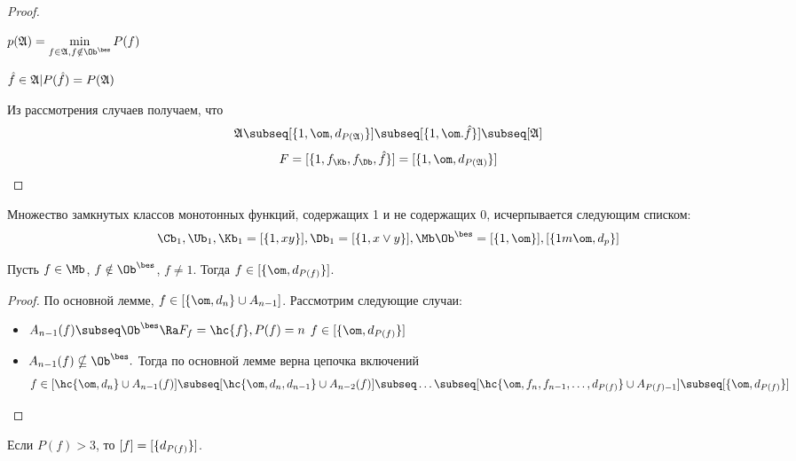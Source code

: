 \documentclass[unicode,10pt]{article}
\begin{document}
\begin{proof}
\begin{enumerate}
\begin{df}
\begin{math}
       p(\ag)=\min\limits_{f\in\ag,f\notin\Oib}P(f)
     \end{math}
   \end{df}
   \begin{denote}
     \begin{math}
       \hat{f}\in\mathfrak{A}|P(\hat{f})=P(\mathfrak{A})
     \end{math}
   \end{denote}
\end{enumerate}
Из рассмотрения случаев получаем, что
\begin{displaymath}
\ag\subseq\cls{1,\om,d_{P(\ag)}}\subseq\cls{1,\om.\hat{f}}\subseq[\ag]
\end{displaymath}
\begin{displaymath}
        F=\cls{1,\fK,\fD,\hat{f}}=\cls{1,\om, d_{P(\ag)}}
\end{displaymath}
\end{proof}
\begin{imp}
  Множество замкнутых классов монотонных функций, содержащих 1 и не содержащих
  0, исчерпывается следующим списком:
  \begin{displaymath}
    \Cb_1,\Ub_1,\Kb_1=\cls{1,xy},\Db_1=\cls{1,\dn}, \Mb\Oib=\cls{1,\om},\cls{1m\om, d_p}
  \end{displaymath}
\end{imp}
\begin{lemma}
  Пусть $f\in\Mb$, $f\notin\Oib$, $f\neq 1$. Тогда $f\in\cls{\om,d_{P(f)}}$.
\end{lemma}
\begin{proof}
    По основной лемме, $f\in[\{\om,d_n\}\cup A_{n-1}]$.
    Рассмотрим следующие случаи:
    \begin{itemize}
        \item
          \begin{math}
            A_{n-1}(f)\subseq\Oib \Ra F_f=\hc{f}, P(f)=n
          \end{math}
          \WHY
          \begin{math}
            f\in\cls{\om,d_{P(f)}}
          \end{math}
        \item
          \begin{math}
            A_{n-1}(f) \nsubseq\Oib.
          \end{math}
          Тогда по основной лемме верна цепочка включений
          \begin{displaymath}
            f\in[\hc{\om,d_n}\cup A_{n-1}(f)]\subseq[\hc{\om,d_n,d_{n-1}}\cup A_{n-2}(f)]\subseq\ldots
            \subseq[\hc{\om,f_n,f_{n-1},\ldots,d_{P(f)}}\cup A_{P(f)-1}]\subseq\cls{\om,d_{P(f)}}
          \end{displaymath}
    \end{itemize}
\end{proof}
\begin{imp}
  Если $P(f)>3$, то $[f] = [\{d_{P(f)}\}]$.
\end{imp}
\end{document}
